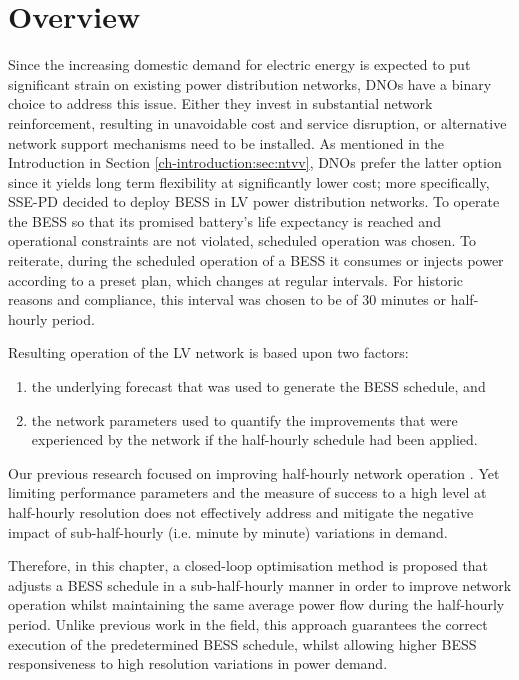 \section{Overview}
\label{ch1:sec:overview}

Since the increasing domestic demand for electric energy is expected to put significant strain on existing power distribution networks, DNOs have a binary choice to address this issue.
Either they invest in substantial network reinforcement, resulting in unavoidable cost and service disruption, or alternative network support mechanisms need to be installed.
As mentioned in the Introduction in Section \ref{ch-introduction:sec:ntvv}, DNOs prefer the latter option since it yields long term flexibility at significantly lower cost; more specifically, SSE-PD decided to deploy BESS in LV power distribution networks.
To operate the BESS so that its promised battery's life expectancy is reached and operational constraints are not violated, scheduled operation was chosen.
To reiterate, during the scheduled operation of a BESS it consumes or injects power according to a preset plan, which changes at regular intervals.
For historic reasons and compliance, this interval was chosen to be of 30 minutes or half-hourly period.

Resulting operation of the LV network is based upon two factors:

\begin{enumerate}
	\item the underlying forecast that was used to generate the BESS schedule, and
	\item the network parameters used to quantify the improvements that were experienced by the network if the half-hourly schedule had been applied.
\end{enumerate}

Our previous research focused on improving half-hourly network operation \cite{Rowe2014a, Yunusov2011}.
Yet limiting performance parameters and the measure of success to a high level at half-hourly resolution does not effectively address and mitigate the negative impact of sub-half-hourly (i.e. minute by minute) variations in demand.

Therefore, in this chapter, a closed-loop optimisation method is proposed that adjusts a BESS schedule in a sub-half-hourly manner in order to improve network operation whilst maintaining the same average power flow during the half-hourly period.
Unlike previous work in the field, this approach guarantees the correct execution of the predetermined BESS schedule, whilst allowing higher BESS responsiveness to high resolution variations in power demand.

